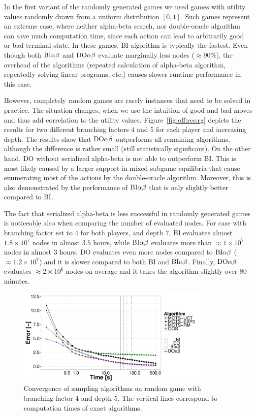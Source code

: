 In the first variant of the randomly generated games we used games with utility values randomly drawn from a uniform distribution $[0,1]$.
Such games represent an extreme case, where neither alpha-beta search, nor double-oracle algorithm can save much computation time, since each action can lead to arbitrarily good or bad terminal state.
In these games, \textsc{BI} algorithm is typically the fastest.
Even though both $\textrm{BI}\alpha\beta$ and $\textrm{DO}\alpha\beta$ evaluate marginally less nodes ($\approx90\%$), the overhead of the algorithms (repeated calculation of alpha-beta algorithm, repeatedly solving linear programs, etc.) causes slower runtime performance in this case.

However, completely random games are rarely instances that need to be solved in practice.
The situation changes, when we use the intuition of good and bad moves and thus add correlation to the utility values.
Figure~\ref{fig:off:res:rg} depicts the results for two different branching factors $4$ and $5$ for each player and increasing depth.
The results show that $\textrm{DO}\alpha\beta$ outperforms all remaining algorithms, although the difference is rather small (still statistically significant).
On the other hand, \textsc{DO} without serialized alpha-beta is not able to outperform \textsc{BI}.
This is most likely caused by a larger support in mixed subgame equilibria that cause enumerating most of the actions by the double-oracle algorithm.
Moreover, this is also demonstrated by the performance of $\textrm{BI}\alpha\beta$ that is only slightly better compared to \textsc{BI}.

The fact that serialized alpha-beta is less successful in randomly generated games is noticeable also when comparing the number of evaluated nodes.
For case with branching factor set to $4$ for both players, and depth $7$, \textsc{BI} evaluates almost $1.8\times10^7$ nodes in almost $3.5$ hours, while $\textrm{BI}\alpha\beta$ evaluates more than $\approx1\times10^7$ nodes in almost $3$ hours.
\textsc{DO} evaluates even more nodes compared to $\textrm{BI}\alpha\beta$ ($\approx1.2\times10^7$) and it is slower compared to both \textsc{BI} and $\textrm{BI}\alpha\beta$.
Finally, $\textrm{DO}\alpha\beta$ evaluates $\approx2\times10^6$ nodes on average and it takes the algorithm slightly over $80$ minutes.

\begin{figure}[t]
\centering
\includegraphics[width=0.85\textwidth]{figures/convergence-rg.pdf}
\caption{Convergence of sampling algorithms on random game with branching factor $4$ and depth $5$. The vertical lines correspond to computation times of exact algorithms.} \label{fig:off:conv:rg}
\end{figure}

